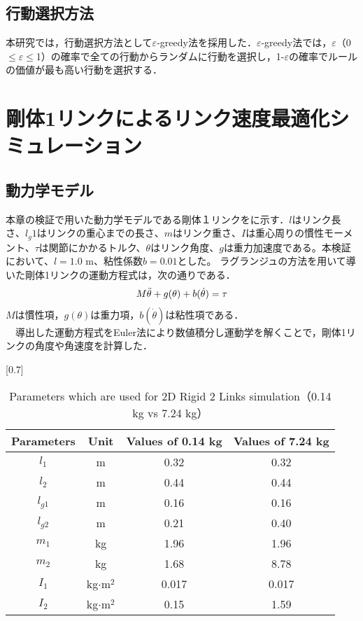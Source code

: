 \begin{small}
\subsection{行動選択方法}
本研究では，行動選択方法として$\varepsilon$-greedy法\cite{greedy}を採用した．$\varepsilon$-greedy法では，$\varepsilon$（0$\leq$$\varepsilon$$\leq$1）の確率で全ての行動からランダムに行動を選択し，1-$\varepsilon$の確率でルールの価値が最も高い行動を選択する．
\section{剛体1リンクによるリンク速度最適化シミュレーション}
\subsection{動力学モデル}
本章の検証で用いた動力学モデルである剛体１リンクをに示す．$l$はリンク長さ、$l_g{1}$はリンクの重心までの長さ、$m$はリンク重さ、$I$は重心周りの慣性モーメント、$\tau$は関節にかかるトルク、$\theta$はリンク角度、$g$は重力加速度である。本検証において、$l=1.0$ m、粘性係数$b=0.01$とした。
ラグランジュの方法\cite{lagrange}を用いて導いた剛体1リンクの運動方程式は，次の通りである．
\begin{eqnarray}
  \equlabel{2}
  M\ddot{\theta} + g(\theta) + b(\dot{\theta}) = \tau
\end{eqnarray}
$M$は慣性項，$g(\theta)$は重力項，$b(\dot{\theta})$は粘性項である．\\
　導出した運動方程式をEuler法\cite{euler}により数値積分し運動学を解くことで，剛体1リンクの角度や角速度を計算した．
\begin{table}[t]
  \begin{center}
    \caption{Parameters which are used for 2D Rigid 2 Links simulation（0.14 kg vs 7.24 kg）}
    \scalebox{0.7}[0.7]{
    \begin{tabular}{c|c|c|c}
      \hline
      Parameters & Unit & Values of 0.14 kg & Values of 7.24 kg \\
      \hline
      $l_{1}$ & m & 0.32 & 0.32\\
      $l_{2}$ & m & 0.44 & 0.44\\
      $l_{g1}$ & m & 0.16 & 0.16 \\
      $l_{g2}$ & m & 0.21 & 0.40 \\
      $m_{1}$ & kg & 1.96 & 1.96\\
      $m_{2}$ & kg & 1.68 & 8.78 \\
      $I_{1}$ & kg$\cdot$$\mathrm{m}^2$ & 0.017 & 0.017 \\
      $I_{2}$ & kg$\cdot$$\mathrm{m}^2$ & 0.15 & 1.59 \\
      \hline
    \end{tabular}
    }
  \end{center}
\end{table}

\end{small}

